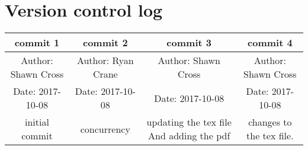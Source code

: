 \documentclass[letterpaper,10pt,titlepage]{article}
\begin{document}
\section{Version control log}
\begin{center}
   \begin{tabular}{ |c|c|c|c|}
      \hline
      commit 1&commit 2&commit 3&commit 4\\ 
      \hline
      Author: Shawn Cross &Author: Ryan Crane &Author: Shawn Cross &Author: Shawn Cross \\
      \hline
      Date:   2017-10-08&Date:   2017-10-08&Date:   2017-10-08&Date:   2017-10-08\\
      \hline
      initial commit&concurrency&updating the tex file And adding the pdf&changes to the tex file.\\
      \hline
   \end{tabular}
\end{center}
%
\end{document}
